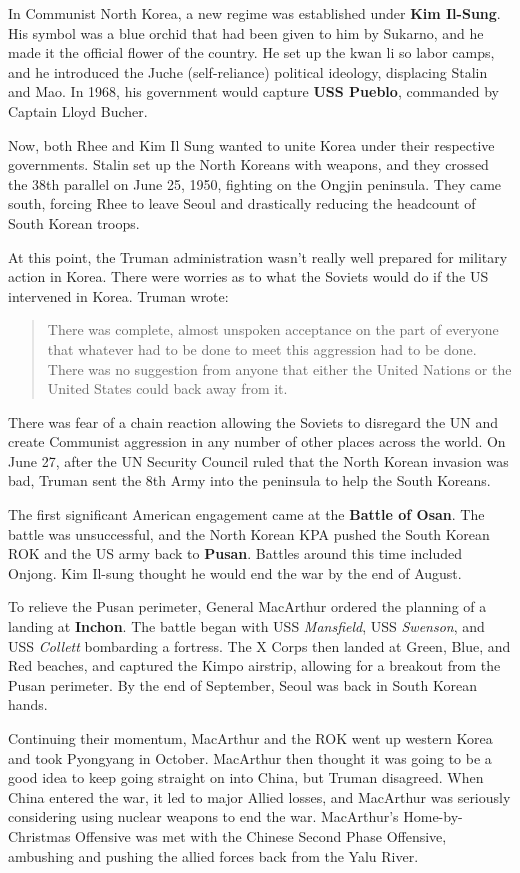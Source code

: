 In Communist North Korea, a new regime was established under \textbf{Kim Il-Sung}.
His symbol was a blue orchid that had been given to him by Sukarno, and he made it the official flower of the country.
He set up the kwan li so labor camps,
and he introduced the Juche (self-reliance) political ideology, displacing Stalin and Mao.
In 1968, his government would capture \textbf{USS Pueblo}, commanded by Captain Lloyd Bucher.

Now, both Rhee and Kim Il Sung wanted to unite Korea under their respective governments.
Stalin set up the North Koreans with weapons,
and they crossed the 38th parallel on June 25, 1950, fighting on the Ongjin peninsula.
They came south, forcing Rhee to leave Seoul and drastically reducing the headcount of South Korean troops.

At this point, the Truman administration wasn't really well prepared for military action in Korea.
There were worries as to what the Soviets would do if the US intervened in Korea.
Truman wrote:
\begin{quote}
  There was complete,
  almost unspoken acceptance on the part of everyone
  that whatever had to be done to meet this aggression had to be done.
  There was no suggestion from anyone that either the United Nations or the United States could back away from it.
\end{quote}
There was fear of a chain reaction allowing the Soviets to disregard the UN
and create Communist aggression in any number of other places across the world.
On June 27, after the UN Security Council ruled that the North Korean invasion was bad,
Truman sent the 8th Army into the peninsula to help the South Koreans.

The first significant American engagement came at the \textbf{Battle of Osan}.
The battle was unsuccessful,
and the North Korean KPA pushed the South Korean ROK and the US army back to \textbf{Pusan}.
Battles around this time included Onjong.
Kim Il-sung thought he would end the war by the end of August.

To relieve the Pusan perimeter, General MacArthur ordered the planning of a landing at \textbf{Inchon}.
The battle began with USS \textit{Mansfield}, USS \textit{Swenson}, and USS \textit{Collett} bombarding a fortress.
The X Corps then landed at Green, Blue, and Red beaches, and captured the Kimpo airstrip,
allowing for a breakout from the Pusan perimeter.
By the end of September, Seoul was back in South Korean hands.

Continuing their momentum, MacArthur and the ROK went up western Korea and took Pyongyang in October.
MacArthur then thought it was going to be a good idea to keep going straight on into China, but Truman disagreed.
When China entered the war, it led to major Allied losses,
and MacArthur was seriously considering using nuclear weapons to end the war.
MacArthur's Home-by-Christmas Offensive was met with the Chinese Second Phase Offensive,
ambushing and pushing the allied forces back from the Yalu River.

